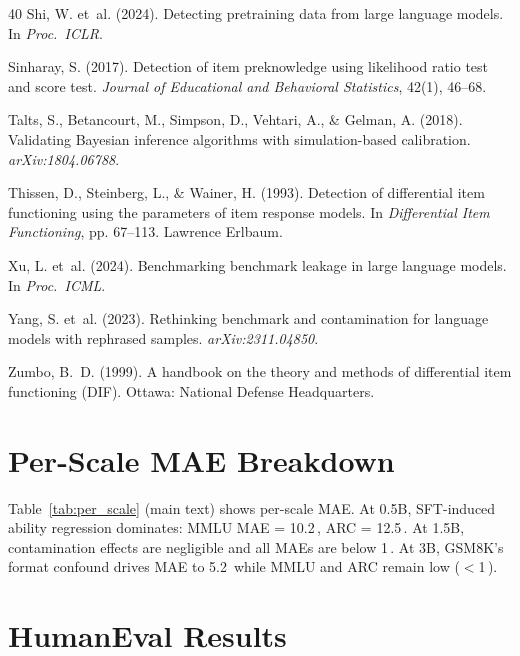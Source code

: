 \documentclass[11pt,a4paper]{article}
\newcommand{\pp}{\,\text{pp}}
\begin{document}
\begin{thebibliography}{40}
Shi, W. et~al. (2024).
\newblock Detecting pretraining data from large language models.
\newblock In \emph{Proc.\ ICLR}.

Sinharay, S. (2017).
\newblock Detection of item preknowledge using likelihood ratio test and score test.
\newblock \emph{Journal of Educational and Behavioral Statistics}, 42(1), 46--68.

Talts, S., Betancourt, M., Simpson, D., Vehtari, A., \& Gelman, A. (2018).
\newblock Validating {Bayesian} inference algorithms with simulation-based calibration.
\newblock \emph{arXiv:1804.06788}.

Thissen, D., Steinberg, L., \& Wainer, H. (1993).
\newblock Detection of differential item functioning using the parameters of item response models.
\newblock In \emph{Differential Item Functioning}, pp. 67--113. Lawrence Erlbaum.

Xu, L. et~al. (2024).
\newblock Benchmarking benchmark leakage in large language models.
\newblock In \emph{Proc.\ ICML}.

Yang, S. et~al. (2023).
\newblock Rethinking benchmark and contamination for language models with rephrased samples.
\newblock \emph{arXiv:2311.04850}.

Zumbo, B.~D. (1999).
\newblock A handbook on the theory and methods of differential item functioning ({DIF}).
\newblock Ottawa: National Defense Headquarters.

\end{thebibliography}

\appendix
\section{Per-Scale MAE Breakdown}
\label{app:per_scale}

Table~\ref{tab:per_scale} (main text) shows per-scale MAE. At 0.5B, SFT-induced ability regression dominates: MMLU MAE = 10.2\pp{}, ARC = 12.5\pp{}. At 1.5B, contamination effects are negligible and all MAEs are below 1\pp{}. At 3B, GSM8K's format confound drives MAE to 5.2\pp{} while MMLU and ARC remain low ($<$1\pp{}).

\section{HumanEval Results}
\label{app:humaneval}
\end{document}
